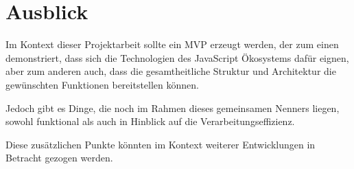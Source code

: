 \section{Ausblick}

Im Kontext dieser Projektarbeit sollte ein MVP erzeugt werden, der zum einen demonstriert, dass sich die Technologien des JavaScript Ökosystems dafür eignen, aber zum anderen auch, dass die gesamtheitliche Struktur und Architektur die gewünschten Funktionen bereitstellen können.

Jedoch gibt es Dinge, die noch im Rahmen dieses gemeinsamen Nenners liegen, sowohl funktional als auch in Hinblick auf die Verarbeitungseffizienz.

Diese zusätzlichen Punkte könnten im Kontext weiterer Entwicklungen in Betracht gezogen werden.

